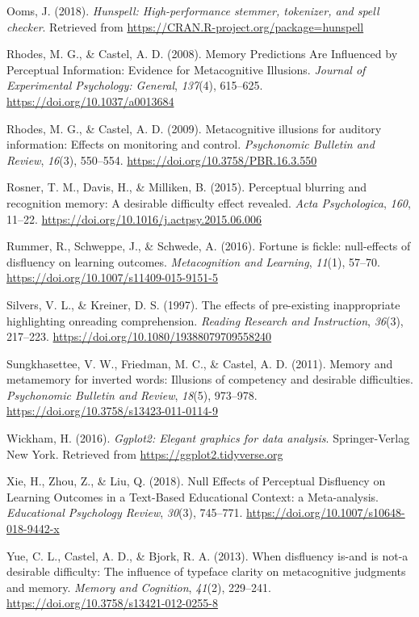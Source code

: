 \documentclass[english,pdf]{apa6}
\begin{document}
\leavevmode\hypertarget{ref-Ooms2018}{}%
Ooms, J. (2018). \emph{Hunspell: High-performance stemmer, tokenizer, and spell checker}. Retrieved from \url{https://CRAN.R-project.org/package=hunspell}

\leavevmode\hypertarget{ref-Rhodes2008}{}%
Rhodes, M. G., \& Castel, A. D. (2008). Memory Predictions Are Influenced by Perceptual Information: Evidence for Metacognitive Illusions. \emph{Journal of Experimental Psychology: General}, \emph{137}(4), 615--625. \url{https://doi.org/10.1037/a0013684}

\leavevmode\hypertarget{ref-Rhodes2009}{}%
Rhodes, M. G., \& Castel, A. D. (2009). Metacognitive illusions for auditory information: Effects on monitoring and control. \emph{Psychonomic Bulletin and Review}, \emph{16}(3), 550--554. \url{https://doi.org/10.3758/PBR.16.3.550}

\leavevmode\hypertarget{ref-Rosner2015}{}%
Rosner, T. M., Davis, H., \& Milliken, B. (2015). Perceptual blurring and recognition memory: A desirable difficulty effect revealed. \emph{Acta Psychologica}, \emph{160}, 11--22. \url{https://doi.org/10.1016/j.actpsy.2015.06.006}

\leavevmode\hypertarget{ref-Rummer2016}{}%
Rummer, R., Schweppe, J., \& Schwede, A. (2016). Fortune is fickle: null-effects of disfluency on learning outcomes. \emph{Metacognition and Learning}, \emph{11}(1), 57--70. \url{https://doi.org/10.1007/s11409-015-9151-5}

\leavevmode\hypertarget{ref-Silvers1997}{}%
Silvers, V. L., \& Kreiner, D. S. (1997). The effects of pre-existing inappropriate highlighting onreading comprehension. \emph{Reading Research and Instruction}, \emph{36}(3), 217--223. \url{https://doi.org/10.1080/19388079709558240}

\leavevmode\hypertarget{ref-Sungkhasettee2011}{}%
Sungkhasettee, V. W., Friedman, M. C., \& Castel, A. D. (2011). Memory and metamemory for inverted words: Illusions of competency and desirable difficulties. \emph{Psychonomic Bulletin and Review}, \emph{18}(5), 973--978. \url{https://doi.org/10.3758/s13423-011-0114-9}

\leavevmode\hypertarget{ref-Wickham2016}{}%
Wickham, H. (2016). \emph{Ggplot2: Elegant graphics for data analysis}. Springer-Verlag New York. Retrieved from \url{https://ggplot2.tidyverse.org}

\leavevmode\hypertarget{ref-Xie2018}{}%
Xie, H., Zhou, Z., \& Liu, Q. (2018). Null Effects of Perceptual Disfluency on Learning Outcomes in a Text-Based Educational Context: a Meta-analysis. \emph{Educational Psychology Review}, \emph{30}(3), 745--771. \url{https://doi.org/10.1007/s10648-018-9442-x}

\leavevmode\hypertarget{ref-Yue2013}{}%
Yue, C. L., Castel, A. D., \& Bjork, R. A. (2013). When disfluency is-and is not-a desirable difficulty: The influence of typeface clarity on metacognitive judgments and memory. \emph{Memory and Cognition}, \emph{41}(2), 229--241. \url{https://doi.org/10.3758/s13421-012-0255-8}

\endgroup
\end{document}
